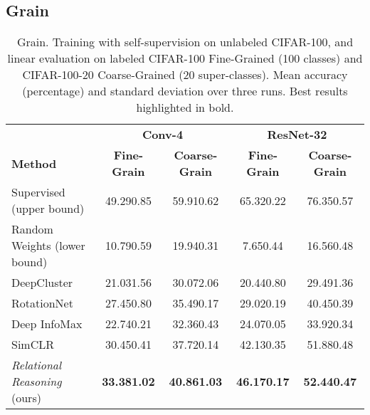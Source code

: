\documentclass{article}
\begin{document}
\subsection{Grain}\label{appendix:additional_grain}

\begin{table}[H]
 \caption{Grain. Training with self-supervision on unlabeled CIFAR-100, and linear evaluation on labeled CIFAR-100 Fine-Grained (100 classes) and CIFAR-100-20 Coarse-Grained (20 super-classes). Mean accuracy (percentage) and standard deviation over three runs. Best results highlighted in bold.}
 \label{tab:fine_coarse}
 \begin{adjustbox}{width=0.85\columnwidth,center}
  \centering
  \begin{tabular}{lcccc}
    \toprule
     & \multicolumn{2}{c}{\textbf{Conv-4}} & \multicolumn{2}{c}{\textbf{ResNet-32}} \\
    \cmidrule[0.1pt](r){2-3} \cmidrule[0.1pt](l){4-5}
    \textbf{Method} &
    \textbf{Fine-Grain} & \textbf{Coarse-Grain} &
    \textbf{Fine-Grain} & \textbf{Coarse-Grain} \\
    \midrule
    Supervised (upper bound) & 
    49.29\small{0.85}  & 59.91\small{0.62} &
    65.32\small{0.22}  & 76.35\small{0.57} \\
    Random Weights (lower bound) & 
    10.79\small{0.59} & 19.94\small{0.31} &
    7.65\small{0.44}  & 16.56\small{0.48} \\
    \cmidrule(l){1-5}
    DeepCluster \citep{caron2018deep} & 
    21.03\small{1.56}  & 30.07\small{2.06} &
    20.44\small{0.80}  & 29.49\small{1.36} \\
    RotationNet \citep{gidaris2018unsupervised} & 
    27.45\small{0.80}  & 35.49\small{0.17} &
    29.02\small{0.19}  & 40.45\small{0.39} \\
    Deep InfoMax \citep{hjelm2018learning} & 
    22.74\small{0.21}  & 32.36\small{0.43} &
    24.07\small{0.05}  & 33.92\small{0.34} \\
    SimCLR \citep{chen2020simple} & 
    30.45\small{0.41}  & 37.72\small{0.14} &
    42.13\small{0.35}  & 51.88\small{0.48} \\    
    \emph{Relational Reasoning} (ours) & 
    \textbf{33.38\small{1.02}}  & \textbf{40.86\small{1.03}} &
    \textbf{46.17\small{0.17}}  & \textbf{52.44\small{0.47}} \\
    \bottomrule
  \end{tabular}
 \end{adjustbox}
\end{table}
\end{document}
